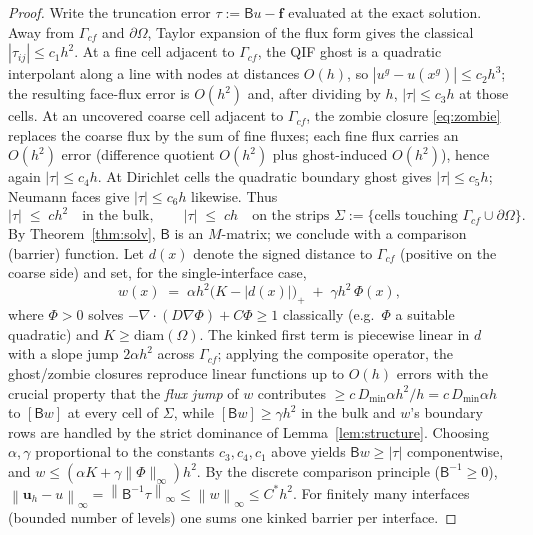 \documentclass[11pt]{article}
\theoremstyle{remark}
\newcommand{\dive}{\nabla\!\cdot\!}
\newcommand{\norminf}[1]{\left\|#1\right\|_\infty}
\begin{document}
\begin{proof}
Write the truncation error $\tau:=\mathsf B u - \mathbf f$ evaluated at
the exact solution.  Away from $\Gamma_{cf}$ and $\partial\Omega$,
Taylor expansion of the flux form gives the classical
$|\tau_{ij}|\le c_1h^2$.  At a fine cell adjacent to $\Gamma_{cf}$, the
QIF ghost is a quadratic interpolant along a line with nodes at
distances $O(h)$, so $|u^g-u(x^g)|\le c_2h^3$; the resulting face-flux
error is $O(h^2)$ and, after dividing by $h$, $|\tau|\le c_3h$ at those
cells.  At an uncovered coarse cell adjacent to $\Gamma_{cf}$, the
zombie closure \eqref{eq:zombie} replaces the coarse flux by the sum of
fine fluxes; each fine flux carries an $O(h^2)$ error (difference
quotient $O(h^2)$ plus ghost-induced $O(h^2)$), hence again
$|\tau|\le c_4 h$.  At Dirichlet cells the quadratic boundary ghost
gives $|\tau|\le c_5 h$; Neumann faces give $|\tau| \le c_6 h$ likewise.
Thus
\[
  |\tau| \;\le\; c h^2 \quad\text{in the bulk},\qquad
  |\tau| \;\le\; c h \quad\text{on the strips }
  \Sigma:=\{\text{cells touching }\Gamma_{cf}\cup\partial\Omega\}.
\]
By Theorem~\ref{thm:solv}, $\mathsf B$ is an $M$-matrix; we conclude
with a comparison (barrier) function.  Let $d(x)$ denote the signed
distance to $\Gamma_{cf}$ (positive on the coarse side) and set, for the
single-interface case,
\[
  w(x) \;=\; \alpha h^2\bigl(K - |d(x)|\bigr)_+ \;+\;
  \gamma h^2\,\Phi(x),
\]
where $\Phi>0$ solves $-\dive(D\nabla\Phi)+C\Phi\ge 1$ classically
(e.g.\ $\Phi$ a suitable quadratic) and $K\ge\mathrm{diam}(\Omega)$.
The kinked first term is piecewise linear in $d$ with a slope jump
$2\alpha h^2$ across $\Gamma_{cf}$; applying the composite operator, the
ghost/zombie closures reproduce linear functions up to $O(h)$ errors
with the crucial property that the \emph{flux jump} of $w$ contributes
$\ge c\,D_{\min}\alpha h^2/h = c\,D_{\min}\alpha h$ to $[\mathsf B w]$
at every cell of $\Sigma$, while $[\mathsf Bw]\ge \gamma h^2$ in the
bulk and $w$'s boundary rows are handled by the strict dominance of
Lemma~\ref{lem:structure}.  Choosing $\alpha,\gamma$ proportional to the
constants $c_3,c_4,c_1$ above yields $\mathsf B w \ge |\tau|$
componentwise, and $w\le (\alpha K+\gamma\|\Phi\|_\infty)h^2$.  By the
discrete comparison principle ($\mathsf B^{-1}\ge0$),
$\norminf{\mathbf u_h-u}=\norminf{\mathsf B^{-1}\tau}\le\norminf{w}\le
C^\ast h^2$.  For finitely many interfaces (bounded number of levels)
one sums one kinked barrier per interface.
\end{proof}
\end{document}
